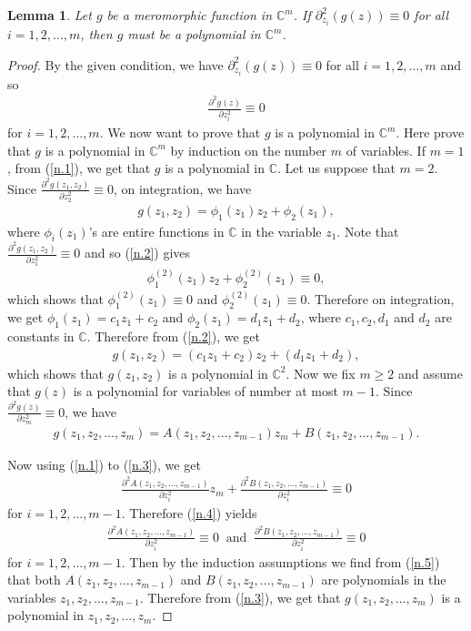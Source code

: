 \documentclass[11pt, reqno]{amsart}
\newtheorem{lem}{Lemma}[section]
\numberwithin{equation}{section}
\begin{document}
\begin{lem}\label{l2.5} Let $g$ be a meromorphic function in $\mathbb{C}^m$. If $\partial^2_{z_i}(g(z))\equiv 0$ for all $i=1,2,\ldots,m$, then $g$ must be a polynomial in $\mathbb{C}^m$.
\end{lem}
\begin{proof} By the given condition, we have $\partial^2_{z_i}(g(z))\equiv 0$ for all $i=1,2,\ldots,m$ and so
\begin{align}\label{n.1} 
\frac{\partial^2g(z)}{\partial z_i^2}\equiv 0
\end{align}
for $i=1,2,\ldots,m$. We now want to prove that $g$ is a polynomial in $\mathbb{C}^m$. Here prove that $g$ is a polynomial in $\mathbb{C}^m$ by induction on the number $m$ of variables. If $m=1$, from (\ref{n.1}), we get that $g$ is a polynomial in $\mathbb{C}$. Let us suppose that $m=2$. Since $\frac{\partial^2g(z_1,z_2)}{\partial z_2^2}\equiv 0$, on integration, we have 
\begin{align}\label{n.2} 
g(z_1,z_2)=\phi_1(z_1)z_2+\phi_2(z_1),
\end{align}
where $\phi_i(z_1)$'s are entire functions in $\mathbb{C}$ in the variable $z_1$. Note that $\frac{\partial^2g(z_1,z_2)}{\partial z_1^2}\equiv 0$ and so (\ref{n.2}) gives 
\begin{align*}
\phi_1^{(2)}(z_1)z_2+\phi_2^{(2)}(z_1)\equiv 0,
\end{align*}
which shows that $\phi_1^{(2)}(z_1)\equiv 0$ and $\phi_2^{(2)}(z_1)\equiv 0$. Therefore on integration, we get
$\phi_1(z_1)=c_1z_1+c_2$ and $\phi_2(z_1)=d_1z_1+d_2$, where $c_1,c_2,d_1$ and $d_2$ are constants in $\mathbb{C}$. Therefore from (\ref{n.2}), we get 
\begin{align*}
g(z_1,z_2)=(c_1z_1+c_2)z_2+(d_1z_1+d_2),
\end{align*}
 which shows that $g(z_1,z_2)$ is a polynomial in $\mathbb{C}^2$. Now we fix $m\geq 2$ and assume that $g(z)$ is a polynomial for variables of number at most $m-1$. Since $\frac{\partial^2g(z)}{\partial z_m^2}\equiv 0$, we have 
\begin{align}\label{n.3} 
g(z_1,z_2,\ldots,z_m)= A(z_1,z_2,\ldots,z_{m-1})z_m+B(z_1,z_2,\ldots,z_{m-1}).
\end{align}

Now using (\ref{n.1}) to (\ref{n.3}), we get
\begin{align}\label{n.4} 
\frac{\partial^2 A(z_1,z_2,\ldots,z_{m-1})}{\partial z_i^2}z_m+\frac{\partial^2 B(z_1,z_2,\ldots,z_{m-1})}{\partial z_i^2}\equiv 0
\end{align}
for $i=1,2,\ldots,m-1$. Therefore (\ref{n.4}) yields
\begin{align}\label{n.5} 
\frac{\partial^2 A(z_1,z_2,\ldots,z_{m-1})}{\partial z_i^2}\equiv 0\;\;\text{and}\;\;\frac{\partial^2 B(z_1,z_2,\ldots,z_{m-1})}{\partial z_i^2}\equiv 0
\end{align}
for $i=1,2,\ldots,m-1$. Then by the induction assumptions we find from (\ref{n.5}) that both $A(z_1,z_2,\ldots,z_{m-1})$ and $B(z_1,z_2,\ldots,z_{m-1})$ are polynomials in the variables $z_1,z_2,\ldots,z_{m-1}$. Therefore from (\ref{n.3}), we get that $g(z_1,z_2,\ldots,z_m)$ is a polynomial in $z_1,z_2,\ldots,z_m$.
\end{proof}
\end{document}
